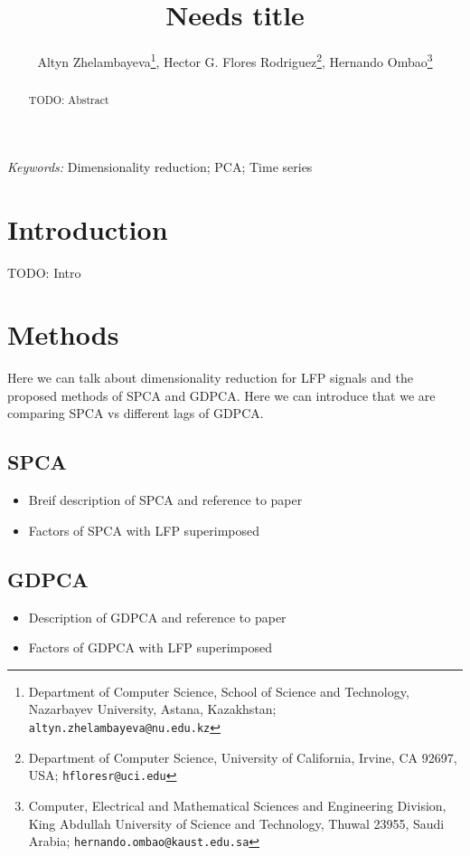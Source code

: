 \documentclass[12pt]{article}
\begin{document}
\date{}
\def\spacingset#1{\renewcommand{\baselinestretch}%
{#1}\small\normalsize} \spacingset{1}


\title{\bf Needs title}
\author{Altyn Zhelambayeva\footnote{Department of Computer Science, School of Science and Technology, Nazarbayev University, Astana, Kazakhstan; \texttt{altyn.zhelambayeva@nu.edu.kz}}, Hector G. Flores Rodriguez\footnote{Department of Computer Science, University of California, Irvine, CA 92697, USA; \texttt{hfloresr@uci.edu}}, Hernando Ombao\footnote{Computer, Electrical and Mathematical Sciences and Engineering Division, King Abdullah University of Science and Technology, Thuwal 23955, Saudi Arabia; \texttt{hernando.ombao@kaust.edu.sa}}}
\maketitle


\bigskip
\begin{abstract}
TODO: Abstract
\end{abstract}

\noindent%
{\it Keywords:} Dimensionality reduction; PCA; Time series
\vfill


\newpage
\spacingset{2} %
\section{Introduction} \label{sec:intro}
TODO: Intro


\section{Methods} \label{sec:methods}
Here we can talk about dimensionality reduction for LFP signals and the proposed methods of SPCA and GDPCA. Here we can introduce that we are comparing SPCA vs different lags of GDPCA.


\subsection{SPCA} \label{sec:spca}
\begin{itemize}
\item Breif description of SPCA and reference to paper
\item Factors of SPCA with LFP superimposed
\end{itemize}



\subsection{GDPCA} \label{sec:gdpca}
\begin{itemize}
\item  Description of GDPCA and reference to paper
\item Factors of GDPCA with LFP superimposed
\end{itemize}
\end{document}
